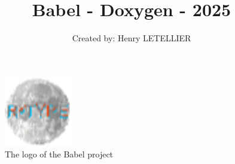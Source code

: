 
\usepackage{graphicx}

\title{Babel - Doxygen - 2025}
\author{Created by: Henry LETELLIER}
\date{} %

\begin{figure}[h]
    \centering
    \includegraphics[width=3cm]{./files/icon/favicon.png}
    \caption*{The logo of the Babel project}
\end{figure}
